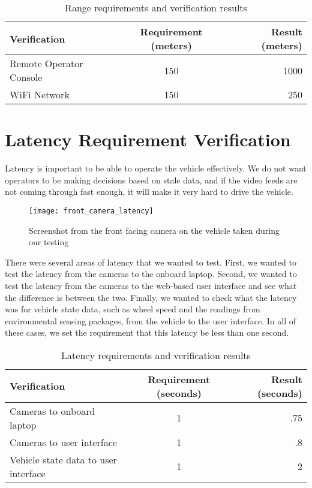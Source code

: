 \begin{table}[ht]
    \centering
    \begin{tabular}{ l | c | r }
      Verification & Requirement (meters) & Result (meters) \\ \hline
      Remote Operator Console & 150 & 1000 \\
      WiFi Network & 150 & 250 \\
    \end{tabular}
    \caption{Range requirements and verification results}
    \label{table:range_verification}
\end{table}

\section{Latency Requirement Verification}
Latency is important to be able to operate the vehicle effectively.  We do not want operators to be making decisions based on stale data, and if the video feeds are not coming through fast enough, it will make it very hard to drive the vehicle.

\begin{figure}[H]
\centerline{\texttt{[image: front\_camera\_latency]}}
\caption[]{Screenshot from the front facing camera on the vehicle taken during our testing}
\label{fig:front_camera_latency}
\end{figure}

There were several areas of latency that we wanted to test.  First, we wanted to test the latency from the cameras to the onboard laptop.  Second, we wanted to test the latency from the cameras to the web-based user interface and see what the difference is between the two.  Finally, we wanted to check what the latency was for vehicle state data, such as wheel speed and the readings from environmental sensing packages, from the vehicle to the user interface.  In all of these cases, we set the requirement that this latency be less than one second.

\begin{table}[ht]
    \centering
    \begin{tabular}{ l | c | r }
      Verification & Requirement (seconds) & Result (seconds) \\ \hline
      Cameras to onboard laptop & 1 & .75 \\
      Cameras to user interface & 1 & .8 \\
      Vehicle state data to user interface & 1 & 2 \\
    \end{tabular}
    \caption{Latency requirements and verification results}
    \label{table:latency_verification}
\end{table}

